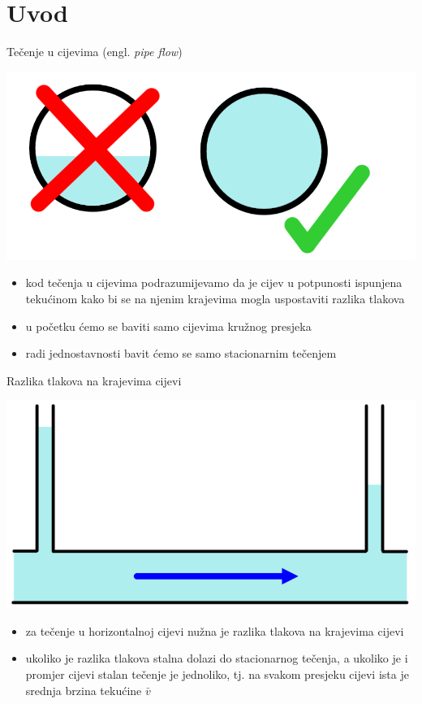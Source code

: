 \documentclass[croatian]{beamer}
\begin{document}
\naslovnislajd

\section{Uvod}
\begin{frame}{Tečenje u cijevima (engl. \emph{pipe flow})}

\begin{center}
\includegraphics[width=0.5\paperwidth]{slike/slika1.PNG}
\par\end{center}
\begin{itemize}
\item kod tečenja u cijevima podrazumijevamo da je cijev u potpunosti ispunjena
tekućinom kako bi se na njenim krajevima mogla uspostaviti razlika
tlakova
\item u početku ćemo se baviti samo cijevima kružnog presjeka
\item radi jednostavnosti bavit ćemo se samo \alert{stacionarnim tečenjem}
\end{itemize}
\end{frame}

\begin{frame}{Razlika tlakova na krajevima cijevi}

\begin{center}
\includegraphics[width=0.5\paperwidth]{slike/slika2.PNG}
\par\end{center}
\begin{itemize}
\item za tečenje u horizontalnoj cijevi nužna je razlika tlakova na krajevima
cijevi
\item ukoliko je razlika tlakova stalna dolazi do stacionarnog tečenja,
a ukoliko je i promjer cijevi stalan tečenje je \alert{jednoliko},
tj. na svakom presjeku cijevi ista je srednja brzina tekućine $\bar{v}$
\end{itemize}
\end{frame}
\end{document}
